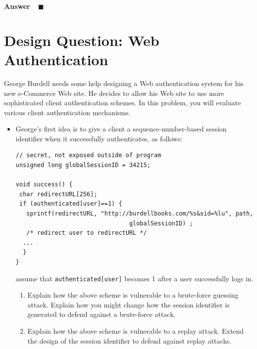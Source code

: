 \documentclass[11pt]{article}
\newcounter{pctr}
\newcommand{\sols}[1]{#1}
\newcommand{\sols}[1]{}
\newcounter{answer}
\newenvironment{answer}[1][\relax]{\refstepcounter{answer}\begin{list}%
 {}{\leftmargin 0pt\rightmargin 0pt\labelsep 3pt\parsep 0pt%
 \setlength{\listparindent}{\parindent}}
    \item {\bf Answer \theanswer #1}\
    }{\hspace*{\fill}$\blacksquare$\end{list}}
\newcommand\prob[1]%
  {\begin{itemize}\item[]%
   \vspace{.2in}{\bf\thepctr. ~[#1~ points]:}\stepcounter{pctr}}
\newcommand\eprob{\end{itemize}}
\begin{document}
\sols{
\vspace{-1.25in}
\begin{answer}
\end{answer}
}


\newpage
\section{Design Question: Web Authentication}

George Burdell needs some help designing a Web authentication system for
his new e-Commerce Web site.  He decides to allow his Web site to use
more sophisticated client authentication schemes.  In this problem, you
will evaluate various client authentication mechanisms.

\prob{6} George's first idea is to give a client a
sequence-number-based session identifier when it successfully
authenticates, as follows:

\begin{verbatim}
// secret, not exposed outside of program
unsigned long globalSessionID = 34215;

void success() {
 char redirectURL[256];
 if (authenticated[user]==1) {
   sprintf(redirectURL, "http://burdellbooks.com/%s&sid=%lu", path,
                                globalSessionID) ; 
   /* redirect user to redirectURL */
  ...
  }
}
\end{verbatim}
\noindent
assume that {\tt authenticated[user]} becomes 1 after a user
successfully logs in.

\begin{enumerate}
\item Explain how the above scheme is vulnerable to a brute-force
  guessing attack.  Explain how you might change how the session
  identifier is generated to defend against a brute-force attack.
\item Explain how the above scheme is vulnerable to a replay attack.
  Extend the design of the session identifier to defend against replay
  attacks. 
\end{enumerate}
\eprob
\end{document}
